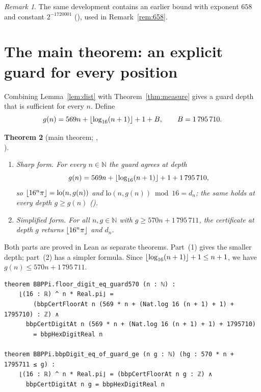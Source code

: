 \documentclass[11pt]{amsart}
\newtheorem{theorem}{Theorem}[section]
\theoremstyle{definition}
\theoremstyle{remark}
\newtheorem{remark}[theorem]{Remark}
\newcommand{\N}{\mathbb{N}}
\newcommand{\lo}{\mathrm{lo}}
\DeclarePairedDelimiter{\floor}{\lfloor}{\rfloor}
\newcommand{\Bconst}{1\,795\,710}
\newcommand{\Bsimple}{1\,795\,711}
\begin{document}
\begin{remark}
The same development contains an earlier bound with exponent $658$ and
constant $2^{-1720001}$ (), used in
Remark~\ref{rem:658}.
\end{remark}

\section{The main theorem: an explicit guard for every position}\label{sec:main}

Combining Lemma~\ref{lem:dist} with Theorem~\ref{thm:measure} gives a guard
depth that is sufficient for every $n$. Define
\[
  g(n)=569n+\floor{\log_{16}(n+1)}+1+B,\qquad B=\Bconst .
\]

\begin{theorem}[main theorem; ,\\
  ]\label{thm:main}
\leavevmode
\begin{enumerate}
\item \emph{Sharp form.} For every $n\in\N$ the guard agrees at depth
  \[
    g(n)=569n+\floor{\log_{16}(n+1)}+1+\Bconst ,
  \]
  so $\floor{16^n\pi}=\lo(n,g(n))$ and $\lo(n,g(n))\bmod16=d_n$; the same
  holds at every depth $g\ge g(n)$ ().
\item \emph{Simplified form.} For all $n,g\in\N$ with $g\ge570n+\Bsimple$,
  the certificate at depth $g$ returns $\floor{16^n\pi}$ and $d_n$.
\end{enumerate}
\end{theorem}

Both parts are proved in Lean as separate theorems. Part~(1) gives the
smaller depth; part~(2) has a simpler formula. Since
$\floor{\log_{16}(n+1)}+1\le n+1$, we have $g(n)\le570n+\Bsimple$.

\begin{lstlisting}
theorem BBPPi.floor_digit_eq_guard570 (n : ℕ) :
    ⌊(16 : ℝ) ^ n * Real.pi⌋ =
        (bbpCertFloorAt n (569 * n + (Nat.log 16 (n + 1) + 1) + 1795710) : ℤ) ∧
      bbpCertDigitAt n (569 * n + (Nat.log 16 (n + 1) + 1) + 1795710)
        = bbpHexDigitReal n

theorem BBPPi.bbpDigit_eq_of_guard_ge (n g : ℕ) (hg : 570 * n + 1795711 ≤ g) :
    ⌊(16 : ℝ) ^ n * Real.pi⌋ = (bbpCertFloorAt n g : ℤ) ∧
      bbpCertDigitAt n g = bbpHexDigitReal n
\end{lstlisting}
\end{document}
